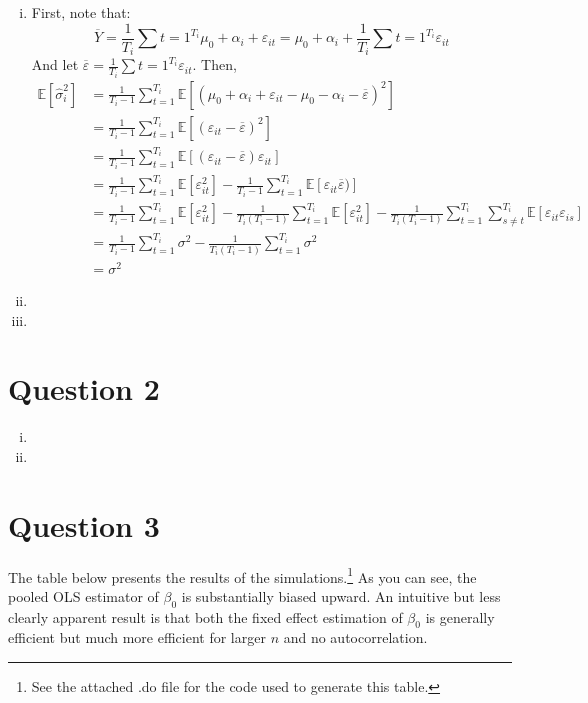 \documentclass{article}
\newcommand{\eps}{\varepsilon}
\newcommand{\esti}{\frac{1}{T_i-1}\sum_{t=1}^{T_i}}
\newcommand{\E}[1]{\mathbb{E}\left[#1\right]}%
\begin{document}
\begin{enumerate}[(i)]
	
	\item First, note that:
		\[
			\overline{Y} = \frac{1}{T_i}\sum{t=1}^{T_i}\mu_0 + \alpha_i + \varepsilon_{it} = \mu_0 + \alpha_i + \frac{1}{T_i}\sum{t=1}^{T_i}\varepsilon_{it}
		\]
		And let $\overline{\varepsilon} = \frac{1}{T_i}\sum{t=1}^{T_i}\varepsilon_{it}$. Then,
		\begin{align*}
			\E{\hat{\sigma}_i^2} 	&= \frac{1}{T_i-1}\sum_{t=1}^{T_i}\E{(\mu_0 + \alpha_i + \eps_{it}-\mu_0 - \alpha_i - \overline{\eps})^2}	\\
									&= \frac{1}{T_i-1}\sum_{t=1}^{T_i}\E{(\eps_{it} - \overline{\eps})^2}										\\
									&= \frac{1}{T_i-1}\sum_{t=1}^{T_i}\E{(\eps_{it} - \overline{\eps})\eps_{it}}								\\
									&= \frac{1}{T_i-1}\sum_{t=1}^{T_i}\E{\eps_{it}^2} - \esti\E{\eps_{it}\overline{\eps})}						\\
									&= \frac{1}{T_i-1}\sum_{t=1}^{T_i}\E{\eps_{it}^2} - \frac{1}{T_i(T_i-1)}\sum_{t=1}^{T_i}\E{\eps_{it}^2}
										- \frac{1}{T_i(T_i-1)}\sum_{t=1}^{T_i}\sum_{s\neq t}^{T_i}\E{\eps_{it}\eps_{is}}						\\
									&= \frac{1}{T_i-1}\sum_{t=1}^{T_i}\sigma^2 - \frac{1}{T_i(T_i-1)}\sum_{t=1}^{T_i}\sigma^2					\\
									&= \sigma^2
		\end{align*}
	
	
	\item 
	
	
	\item 
	
	
\end{enumerate}



\section*{Question 2}

\begin{enumerate}[(i)]
	\item 
	

	\item 
	
	
\end{enumerate}



\section*{Question 3}
The table below presents the results of the simulations.\footnote{See the attached .do file for the code used to generate this table.} As you can see, the pooled OLS estimator of $\beta_0$ is substantially biased upward. An intuitive but less clearly apparent result is that both the fixed effect estimation of $\beta_0$ is generally efficient but much more efficient for larger $n$ and no autocorrelation.
\begin{center}
	
\end{center}




\end{document}
